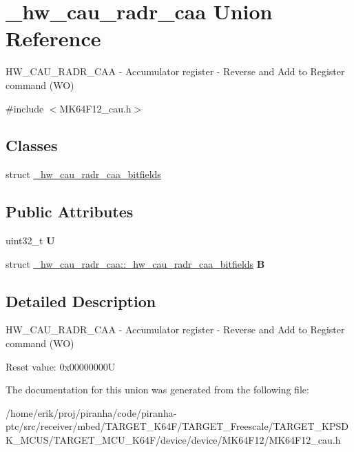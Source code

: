 \hypertarget{union__hw__cau__radr__caa}{}\section{\+\_\+hw\+\_\+cau\+\_\+radr\+\_\+caa Union Reference}
\label{union__hw__cau__radr__caa}


H\+W\+\_\+\+C\+A\+U\+\_\+\+R\+A\+D\+R\+\_\+\+C\+AA -\/ Accumulator register -\/ Reverse and Add to Register command (WO)  




{\ttfamily \#include $<$M\+K64\+F12\+\_\+cau.\+h$>$}

\subsection*{Classes}
\begin{DoxyCompactItemize}
\item 
struct \hyperlink{struct__hw__cau__radr__caa_1_1__hw__cau__radr__caa__bitfields}{\+\_\+hw\+\_\+cau\+\_\+radr\+\_\+caa\+\_\+bitfields}
\end{DoxyCompactItemize}
\subsection*{Public Attributes}
\begin{DoxyCompactItemize}
\item 
uint32\+\_\+t {\bfseries U}\hypertarget{union__hw__cau__radr__caa_a2b8c2540aecf505ec9858b2dfa50856a}{}\label{union__hw__cau__radr__caa_a2b8c2540aecf505ec9858b2dfa50856a}

\item 
struct \hyperlink{struct__hw__cau__radr__caa_1_1__hw__cau__radr__caa__bitfields}{\+\_\+hw\+\_\+cau\+\_\+radr\+\_\+caa\+::\+\_\+hw\+\_\+cau\+\_\+radr\+\_\+caa\+\_\+bitfields} {\bfseries B}\hypertarget{union__hw__cau__radr__caa_a67c853bfc04e2e2b7489adf2e845a788}{}\label{union__hw__cau__radr__caa_a67c853bfc04e2e2b7489adf2e845a788}

\end{DoxyCompactItemize}


\subsection{Detailed Description}
H\+W\+\_\+\+C\+A\+U\+\_\+\+R\+A\+D\+R\+\_\+\+C\+AA -\/ Accumulator register -\/ Reverse and Add to Register command (WO) 

Reset value\+: 0x00000000U 

The documentation for this union was generated from the following file\+:\begin{DoxyCompactItemize}
\item 
/home/erik/proj/piranha/code/piranha-\/ptc/src/receiver/mbed/\+T\+A\+R\+G\+E\+T\+\_\+\+K64\+F/\+T\+A\+R\+G\+E\+T\+\_\+\+Freescale/\+T\+A\+R\+G\+E\+T\+\_\+\+K\+P\+S\+D\+K\+\_\+\+M\+C\+U\+S/\+T\+A\+R\+G\+E\+T\+\_\+\+M\+C\+U\+\_\+\+K64\+F/device/device/\+M\+K64\+F12/M\+K64\+F12\+\_\+cau.\+h\end{DoxyCompactItemize}
